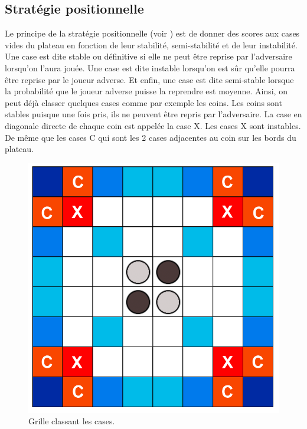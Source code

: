 \documentclass[a4paper,12pt]{report}
\begin{document}
\subsection{Stratégie positionnelle}

Le principe de la stratégie positionnelle (voir \cite{strategy}) est de donner des scores aux cases vides du plateau en fonction de leur stabilité, semi-stabilité et de leur instabilité. Une case est dite stable ou définitive si elle ne peut être reprise par l’adversaire lorsqu’on l’aura jouée. Une case est dite instable lorsqu’on est sûr qu’elle pourra être reprise par le joueur adverse. Et enfin, une case est dite semi-stable lorsque la probabilité que le joueur adverse puisse la reprendre est moyenne.
Ainsi, on peut déjà classer quelques cases comme par exemple les coins. Les coins sont stables puisque une fois pris, ils ne peuvent être repris par l’adversaire. La case en diagonale directe de chaque coin est appelée la case X. Les cases X sont instables. De même que les cases C qui sont les 2 cases adjacentes au coin sur les bords du plateau.

\begin{figure}[H]
\centering
\includegraphics[scale=0.2]{Images/positionnement.png}
\caption{Grille classant les cases.}
\label{pos}
\end{figure}
\end{document}
